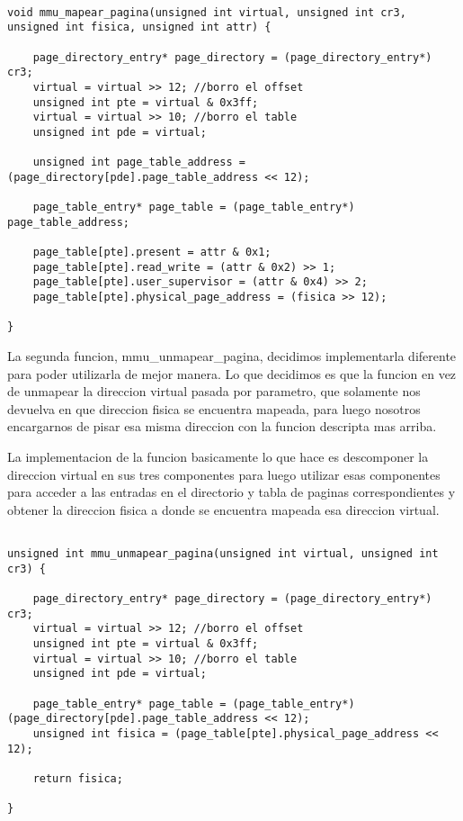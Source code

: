 \documentclass[10pt, a4paper]{article}
\begin{document}
\begin{footnotesize}
\begin{lstlisting}

void mmu_mapear_pagina(unsigned int virtual, unsigned int cr3, unsigned int fisica, unsigned int attr) {
	
	page_directory_entry* page_directory = (page_directory_entry*) cr3;
	virtual = virtual >> 12; //borro el offset
	unsigned int pte = virtual & 0x3ff;
	virtual = virtual >> 10; //borro el table
	unsigned int pde = virtual;
	
	unsigned int page_table_address = (page_directory[pde].page_table_address << 12);
	
	page_table_entry* page_table = (page_table_entry*) page_table_address;

	page_table[pte].present = attr & 0x1;
	page_table[pte].read_write = (attr & 0x2) >> 1;
	page_table[pte].user_supervisor = (attr & 0x4) >> 2;
	page_table[pte].physical_page_address = (fisica >> 12);

}

\end{lstlisting}
\end{footnotesize}

La segunda funcion, mmu\_unmapear\_pagina, decidimos implementarla diferente para poder utilizarla de mejor manera. Lo que decidimos es que la funcion en vez de unmapear la direccion
 virtual pasada por parametro, que solamente nos devuelva en que direccion fisica se encuentra mapeada, para luego nosotros encargarnos de pisar esa misma direccion con la funcion
 descripta mas arriba.
 
La implementacion de la funcion basicamente lo que hace es descomponer la direccion virtual en sus tres componentes para luego utilizar esas componentes para acceder a las entradas
 en el directorio y tabla de paginas correspondientes y obtener la direccion fisica a donde se encuentra mapeada esa direccion virtual.

\begin{footnotesize}
\begin{lstlisting}

unsigned int mmu_unmapear_pagina(unsigned int virtual, unsigned int cr3) {

	page_directory_entry* page_directory = (page_directory_entry*) cr3;
	virtual = virtual >> 12; //borro el offset
	unsigned int pte = virtual & 0x3ff;
	virtual = virtual >> 10; //borro el table
	unsigned int pde = virtual;

	page_table_entry* page_table = (page_table_entry*) (page_directory[pde].page_table_address << 12);
	unsigned int fisica = (page_table[pte].physical_page_address << 12);

	return fisica;

}
\end{lstlisting}
\end{footnotesize}
\end{document}

